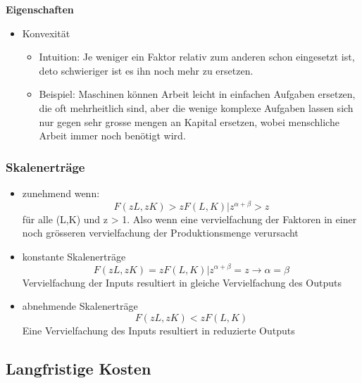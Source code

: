 \textbf{Eigenschaften}

\begin{itemize}
    \item Konvexität
    \begin{itemize}
        \item Intuition: Je weniger ein Faktor relativ zum anderen schon eingesetzt ist, deto schwieriger ist es ihn noch mehr zu ersetzen.
        \item Beispiel: Maschinen können Arbeit leicht in einfachen Aufgaben ersetzen, die oft mehrheitlich sind, aber die wenige komplexe Aufgaben lassen sich nur gegen sehr grosse mengen an Kapital ersetzen, wobei menschliche Arbeit immer noch benötigt wird.
    \end{itemize}
\end{itemize}

\subsubsection{Skalenerträge}
\begin{itemize}
    \item zunehmend wenn:
    \begin{equation}
        F(zL,zK) > zF(L,K) | z^{\alpha + \beta} > z
    \end{equation}
    für alle (L,K) und z > 1. Also wenn eine vervielfachung der Faktoren in einer noch grösseren vervielfachung der Produktionsmenge verursacht
    \item konstante Skalenerträge
    \begin{equation}
        F(zL, zK) = zF(L,K) | z^{\alpha + \beta} = z \rightarrow \alpha = \beta
    \end{equation}
    Vervielfachung der Inputs resultiert in gleiche Vervielfachung des Outputs
    \item abnehmende Skalenerträge
    \begin{equation}
        F(zL,zK) < zF(L,K)
    \end{equation}
    Eine Vervielfachung des Inputs resultiert in reduzierte Outputs
\end{itemize}


\subsection{Langfristige Kosten}

